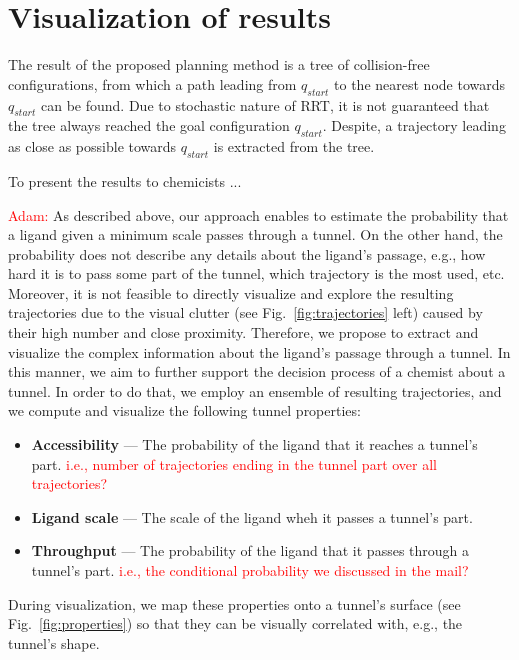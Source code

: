 \documentclass{svmult}
\newcommand{\red}[1]{\textcolor{red}{#1}}
\def\qstart{q_{start}}
\def\qinit{\qstart}
\def\qgoal{\qstart}
\begin{document}
\section{Visualization of results}

The result of the proposed planning method is a tree of collision-free configurations, from which a path leading from $\qinit$
to the nearest node towards $\qgoal$ can be found.
Due to stochastic nature of RRT, it is not guaranteed that the tree always reached the goal configuration $\qgoal$.
Despite, a trajectory leading as close as possible towards $\qgoal$ is extracted from the tree.

To present the results to chemicists ...

\red{Adam: }
As described above, our approach enables to estimate the probability that a ligand given a minimum scale passes through a tunnel.
On the other hand, the probability does not describe any details about the ligand's passage, e.g., how hard it is to pass some part of the tunnel, which trajectory is the most used, etc.
Moreover, it is not feasible to directly visualize and explore the resulting trajectories due to the visual clutter (see Fig.~\ref{fig:trajectories} left) caused by their high number and close proximity.
Therefore, we propose to extract and visualize the complex information about the ligand's passage through a tunnel.
In this manner, we aim to further support the decision process of a chemist about a tunnel.
In order to do that, we employ an ensemble of resulting trajectories, and we compute and visualize the following tunnel properties:
\begin{itemize}
  \item \textbf{Accessibility} --- The probability of the ligand that it reaches a tunnel's part.
  \red{ i.e., number of trajectories ending in the tunnel part over all trajectories? }
  \item \textbf{Ligand scale} --- The scale of the ligand wheh it passes a tunnel's part.
  \item \textbf{Throughput} --- The probability of the ligand that it passes through a tunnel's part.
\red{ i.e., the conditional probability we discussed in the mail?}
\end{itemize}
During visualization, we map these properties onto a tunnel's surface (see Fig.~\ref{fig:properties}) so that they can be visually correlated with, e.g., the tunnel's shape.
\end{document}
